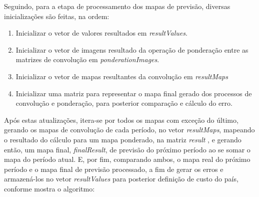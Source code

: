 Seguindo, para a etapa de processamento dos mapas de previsão, diversas inicializações são feitas, na ordem:
\begin{enumerate}
\item Inicializar o vetor de valores resultados em \emph{resultValues}.
\item Inicializar o vetor de imagens resultado da operação de ponderação entre as matrizes de convolução em \emph{ponderationImages}.
\item Inicializar o vetor de mapas resultantes da convolução em \emph{resultMaps}
\item Inicializar uma matriz para representar o mapa final gerado dos processos de convolução e ponderação, para posterior comparação e cálculo do erro.
\end{enumerate}



Após estas atualizações, itera-se por todos os mapas com exceção do último, gerando os mapas de convolução de cada período, no vetor \emph{resultMaps}, mapeando o resultado do cálculo para um mapa ponderado, na matriz \emph{result} , e gerando então, um mapa final, \emph{finalResult}, de previsão do próximo período ao se somar o mapa do período atual. E, por fim, comparando  ambos, o mapa real do próximo período e o mapa final de previsão processado, a fim de gerar os erros e armazená-los no vetor \emph{resultValues} para posterior definição de custo do país, conforme mostra o algoritmo:

